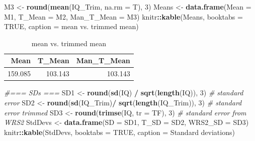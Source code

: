 \documentclass[
]{article}
\newenvironment{Shaded}{\begin{snugshade}}{\end{snugshade}}
\newcommand{\AttributeTok}[1]{\textcolor[rgb]{0.13,0.29,0.53}{#1}}
\newcommand{\CommentTok}[1]{\textcolor[rgb]{0.56,0.35,0.01}{\textit{#1}}}
\newcommand{\ConstantTok}[1]{\textcolor[rgb]{0.56,0.35,0.01}{#1}}
\newcommand{\DecValTok}[1]{\textcolor[rgb]{0.00,0.00,0.81}{#1}}
\newcommand{\FunctionTok}[1]{\textcolor[rgb]{0.13,0.29,0.53}{\textbf{#1}}}
\newcommand{\NormalTok}[1]{#1}
\newcommand{\OtherTok}[1]{\textcolor[rgb]{0.56,0.35,0.01}{#1}}
\newcommand{\SpecialCharTok}[1]{\textcolor[rgb]{0.81,0.36,0.00}{\textbf{#1}}}
\newcommand{\StringTok}[1]{\textcolor[rgb]{0.31,0.60,0.02}{#1}}
\begin{document}
\begin{Shaded}
\begin{Highlighting}[]
\NormalTok{  M3      }\OtherTok{\textless{}{-}} \FunctionTok{round}\NormalTok{(}\FunctionTok{mean}\NormalTok{(IQ\_Trim, }\AttributeTok{na.rm =}\NormalTok{ T), }\DecValTok{3}\NormalTok{)}
\NormalTok{  Means   }\OtherTok{\textless{}{-}} \FunctionTok{data.frame}\NormalTok{(}\AttributeTok{Mean =}\NormalTok{ M1, }\AttributeTok{T\_Mean =}\NormalTok{ M2, }\AttributeTok{Man\_T\_Mean =}\NormalTok{ M3)}
\NormalTok{  knitr}\SpecialCharTok{::}\FunctionTok{kable}\NormalTok{(Means, }\AttributeTok{booktabs =} \ConstantTok{TRUE}\NormalTok{, }\AttributeTok{caption =} \StringTok{\textquotesingle{}mean vs. trimmed mean\textquotesingle{}}\NormalTok{)}
\end{Highlighting}
\end{Shaded}

\begin{table}

\caption{\label{tab:TrimmedMean}mean vs. trimmed mean}
\centering
\begin{tabular}[t]{rrr}
\toprule
Mean & T\_Mean & Man\_T\_Mean\\
\midrule
159.085 & 103.143 & 103.143\\
\bottomrule
\end{tabular}
\end{table}

\begin{Shaded}
\begin{Highlighting}[]
  \CommentTok{\#=== SDs ===}
\NormalTok{  SD1     }\OtherTok{\textless{}{-}} \FunctionTok{round}\NormalTok{(}\FunctionTok{sd}\NormalTok{(IQ) }\SpecialCharTok{/} \FunctionTok{sqrt}\NormalTok{(}\FunctionTok{length}\NormalTok{(IQ)), }\DecValTok{3}\NormalTok{)      }\CommentTok{\# standard error}
\NormalTok{  SD2     }\OtherTok{\textless{}{-}} \FunctionTok{round}\NormalTok{(}\FunctionTok{sd}\NormalTok{(IQ\_Trim)}\SpecialCharTok{/} \FunctionTok{sqrt}\NormalTok{(}\FunctionTok{length}\NormalTok{(IQ\_Trim)), }\DecValTok{3}\NormalTok{) }\CommentTok{\# standard error trimmed}
\NormalTok{  SD3     }\OtherTok{\textless{}{-}} \FunctionTok{round}\NormalTok{(}\FunctionTok{trimse}\NormalTok{(IQ, }\AttributeTok{tr =}\NormalTok{ TF), }\DecValTok{3}\NormalTok{)      }\CommentTok{\# standard error from WRS2}
\NormalTok{  StdDevs }\OtherTok{\textless{}{-}} \FunctionTok{data.frame}\NormalTok{(}\AttributeTok{SD =}\NormalTok{ SD1, }\AttributeTok{T\_SD =}\NormalTok{ SD2, }\AttributeTok{WRS2\_SD =}\NormalTok{ SD3)}
\NormalTok{  knitr}\SpecialCharTok{::}\FunctionTok{kable}\NormalTok{(StdDevs, }\AttributeTok{booktabs =} \ConstantTok{TRUE}\NormalTok{, }\AttributeTok{caption =} \StringTok{\textquotesingle{}Standard deviations\textquotesingle{}}\NormalTok{)}
\end{Highlighting}
\end{Shaded}
\end{document}
